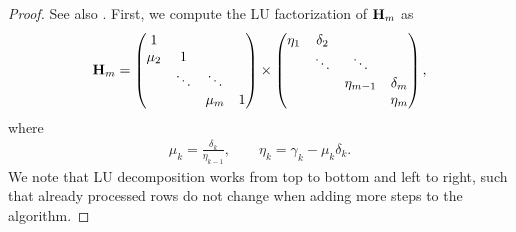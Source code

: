 \begin{proof}
  See also \cite[Section 6.7.1]{Saad00}. First, we compute the LU factorization of $\mathbf H_m$ as
  \begin{gather}
    \mathbf H_m =
    \begin{pmatrix}
      1\\\mu_2&1\\
      &\ddots&\ddots\\
      &&\mu_m&1
    \end{pmatrix}
    \times
    \begin{pmatrix}
      \eta_1&\delta_2\\
      &\ddots&\ddots\\
      &&\eta_{m-1}&\delta_m\\
      &&&\eta_m
    \end{pmatrix},
  \end{gather}
  where
  \begin{gather}
    \mu_k = \frac{\delta_k}{\eta_{k-1}},
    \qquad
    \eta_k = \gamma_k - \mu_k \delta_k.
  \end{gather}
  We note that LU decomposition works from top to bottom and left to
  right, such that already processed rows do not change when adding
  more steps to the algorithm.


\end{proof}
